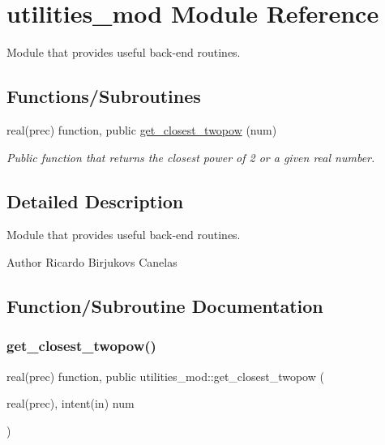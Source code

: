 \hypertarget{namespaceutilities__mod}{}\section{utilities\+\_\+mod Module Reference}
\label{namespaceutilities__mod}


Module that provides useful back-\/end routines.  


\subsection*{Functions/\+Subroutines}
\begin{DoxyCompactItemize}
\item 
real(prec) function, public \mbox{\hyperlink{namespaceutilities__mod_a683f93677348e11d331c1c37c66caf7a}{get\+\_\+closest\+\_\+twopow}} (num)
\begin{DoxyCompactList}\small\item\em Public function that returns the closest power of 2 or a given real number. \end{DoxyCompactList}\end{DoxyCompactItemize}


\subsection{Detailed Description}
Module that provides useful back-\/end routines. 

\begin{DoxyAuthor}{Author}
Ricardo Birjukovs Canelas 
\end{DoxyAuthor}


\subsection{Function/\+Subroutine Documentation}
\mbox{\label{namespaceutilities__mod_a683f93677348e11d331c1c37c66caf7a}} 
\subsubsection{\texorpdfstring{get\+\_\+closest\+\_\+twopow()}{get\_closest\_twopow()}}
{\footnotesize\ttfamily real(prec) function, public utilities\+\_\+mod\+::get\+\_\+closest\+\_\+twopow (\begin{DoxyParamCaption}\item[{real(prec), intent(in)}]{num }\end{DoxyParamCaption})}



